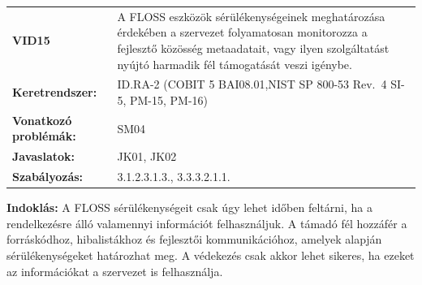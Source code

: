 \documentclass[12pt,magyar,a4paper,oneside]{scrreprt}
\begin{document}
\begin{longtable}[]{@{}ll@{}}
\toprule
\endhead
\begin{minipage}[t]{0.16\columnwidth}\raggedright
\textbf{VID15}\strut
\end{minipage} & \begin{minipage}[t]{0.79\columnwidth}\raggedright
A FLOSS eszközök sérülékenységeinek meghatározása érdekében a szervezet
folyamatosan monitorozza a fejlesztő közösség metaadatait, vagy ilyen
szolgáltatást nyújtó harmadik fél támogatását veszi igénybe.\strut
\end{minipage}\tabularnewline
\begin{minipage}[t]{0.16\columnwidth}\raggedright
\textbf{Keretrendszer:}\strut
\end{minipage} & \begin{minipage}[t]{0.79\columnwidth}\raggedright
ID.RA-2 (COBIT 5 BAI08.01,NIST SP 800-53 Rev.~4 SI-5, PM-15,
PM-16)\strut
\end{minipage}\tabularnewline
\begin{minipage}[t]{0.16\columnwidth}\raggedright
\textbf{Vonatkozó problémák:}\strut
\end{minipage} & \begin{minipage}[t]{0.79\columnwidth}\raggedright
SM04\strut
\end{minipage}\tabularnewline
\begin{minipage}[t]{0.16\columnwidth}\raggedright
\textbf{Javaslatok:}\strut
\end{minipage} & \begin{minipage}[t]{0.79\columnwidth}\raggedright
JK01, JK02\strut
\end{minipage}\tabularnewline
\begin{minipage}[t]{0.16\columnwidth}\raggedright
\textbf{Szabályozás:}\strut
\end{minipage} & \begin{minipage}[t]{0.79\columnwidth}\raggedright
3.1.2.3.1.3., 3.3.3.2.1.1.\strut
\end{minipage}\tabularnewline
\bottomrule
\end{longtable}

\textbf{Indoklás: } A FLOSS sérülékenységeit csak úgy lehet időben
feltárni, ha a rendelkezésre álló valamennyi információt felhasználjuk.
A támadó fél hozzáfér a forráskódhoz, hibalistákhoz és fejlesztői
kommunikációhoz, amelyek alapján sérülékenységeket határozhat meg. A
védekezés csak akkor lehet sikeres, ha ezeket az információkat a
szervezet is felhasználja.
\end{document}
